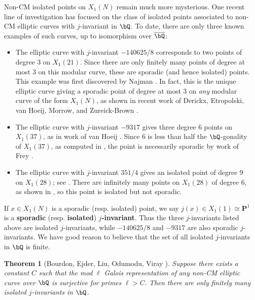 \documentclass[11pt,reqno]{amsart}
\theoremstyle{plain}
\newtheorem{theorem}{Theorem}%
\theoremstyle{definition}
\newcommand{\Q}{\bQ}
\begin{document}
Non-CM isolated points on $X_1(N)$ remain much more mysterious. One recent line of investigation has focused on the class of isolated points associated to non-CM elliptic curves with $j$-invariant in $\Q$. To date, there are only three known examples of such curves, up to isomorphism over $\overline{\Q}$:
\begin{itemize}
    \item The elliptic curve with $j$-invariant $-140625/8$ corresponds to two points of degree 3 on $X_1(21)$. Since there are only finitely many points of degree at most 3 on this modular curve, these are sporadic (and hence isolated) points. This example was first discovered by Najman \cite{najman16}. In fact, this is the unique elliptic curve giving a sporadic point of degree at most 3 on \emph{any} modular curve of the form $X_1(N)$, as shown in recent work of Derickx, Etropolski, van Hoeij, Morrow, and Zureick-Brown \cite{DEvHMZB2021}.

    \item The elliptic curve with $j$-invariant $-9317$ gives three degree 6 points on $X_1(37)$, as in work of van Hoeij \cite{vanHoeij}. Since 6 is less than half the $\Q$-gonality of $X_1(37)$, as computed in \cite{DerickxVanHoeij2014}, the point is necessarily sporadic by work of Frey \cite{frey}.

    \item The elliptic curve with $j$-invariant $351/4$ gives an isolated point of degree 9 on $X_1(28)$; see \cite[Theorem 2]{OddDeg}. There are infinitely many points on $X_1(28)$ of degree 6, as shown in \cite{DerickxVanHoeij2014}, so this point is isolated but not sporadic.
\end{itemize}

If $x \in X_1(N)$ is a sporadic (resp. isolated) point, we say $j(x) \in X_1(1) \cong \mathbf{P}^1$ is a \textbf{sporadic} (resp. \textbf{isolated}) \textbf{$j$-invariant}. Thus the three $j$-invariants listed above are isolated $j$-invariants, while $-140625/8$  and $-9317$ are also sporadic $j$-invariants. We have good reason to believe that the set of all isolated $j$-invariants in $\Q$ is finite.
\begin{theorem}[Bourdon, Ejder, Liu, Odumodu, Viray \cite{BELOV}]
\label{BELOVfiniteness}
Suppose there exists a constant $C$ such that the mod $\ell$ Galois representation of any non-CM elliptic curve over $\Q$ is surjective for primes $\ell>C$. Then there are only finitely many isolated $j$-invariants in $\Q$.
\end{theorem}
\end{document}
